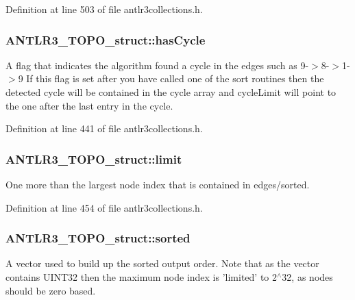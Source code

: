 Definition at line 503 of file antlr3collections.\-h.

\hypertarget{struct_a_n_t_l_r3___t_o_p_o__struct_aeb46288b95c9678318d803794c6083bb}{
\subsubsection[{has\-Cycle}]{ A\-N\-T\-L\-R3\-\_\-\-T\-O\-P\-O\-\_\-struct\-::has\-Cycle}}\label{struct_a_n_t_l_r3___t_o_p_o__struct_aeb46288b95c9678318d803794c6083bb}
A flag that indicates the algorithm found a cycle in the edges such as 9-\/$>$8-\/$>$1-\/$>$9 If this flag is set after you have called one of the sort routines then the detected cycle will be contained in the cycle array and cycle\-Limit will point to the one after the last entry in the cycle. 

Definition at line 441 of file antlr3collections.\-h.

\hypertarget{struct_a_n_t_l_r3___t_o_p_o__struct_a5ae29a928ef2ee25806c73978f2c96b6}{
\subsubsection[{limit}]{ A\-N\-T\-L\-R3\-\_\-\-T\-O\-P\-O\-\_\-struct\-::limit}}\label{struct_a_n_t_l_r3___t_o_p_o__struct_a5ae29a928ef2ee25806c73978f2c96b6}
One more than the largest node index that is contained in edges/sorted. 

Definition at line 454 of file antlr3collections.\-h.

\hypertarget{struct_a_n_t_l_r3___t_o_p_o__struct_a951b50a28f80fe4adb1e3feb94a0b240}{
\subsubsection[{sorted}]{ A\-N\-T\-L\-R3\-\_\-\-T\-O\-P\-O\-\_\-struct\-::sorted}}\label{struct_a_n_t_l_r3___t_o_p_o__struct_a951b50a28f80fe4adb1e3feb94a0b240}
A vector used to build up the sorted output order. Note that as the vector contains U\-I\-N\-T32 then the maximum node index is 'limited' to 2$^\wedge$32, as nodes should be zero based. 

